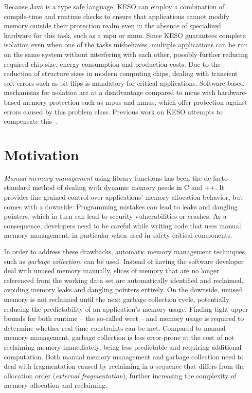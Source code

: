 		Because Java is a type safe language, KESO can employ a combination of compile-time and runtime checks to ensure
		that applications cannot modify memory outside their protection realm even in the absence of specialized hardware
		for this task, such as a \gls{mpu} or \gls{mmu}. Since KESO guarantees complete isolation even when one of the tasks
		misbehaves, multiple applications can be run on the same system without interfering with each other, possibly
		further reducing required chip size, energy consumption and production costs. Due to the reduction of structure
		sizes in modern computing chips, dealing with transient soft errors such as bit flips is mandatory for critical
		applications. Software-based mechanisms for isolation are at a disadvantage compared to \glspl{mcu} with
		hardware-based memory protection such as \glspl{mpu} and \glspl{mmu}, which offer protection against errors caused
		by this problem class. Previous work on KESO attempts to compensate this~\cite{thomm:11:jtres, stilkerich:13:lctes}.

	\section{Motivation}
		\label{sec:intro:motivation}

		\emph{Manual memory management} using library functions has been the de-facto standard method of dealing with
		dynamic memory needs in C and \C++{}. It provides fine-grained control over applications' memory allocation
		behavior, but comes with a downside: Programming mistakes can lead to leaks and dangling pointers, which in turn can
		lead to security vulnerabilities or crashes. As a consequence, developers need to be careful while writing code that
		uses manual memory management, in particular when used in safety-critical components.

		In order to address these drawbacks, automatic memory management techniques, such as \emph{garbage collection}, can
		be used. Instead of having the software developer deal with unused memory manually, slices of memory that are no
		longer referenced from the working data set are automatically identified and reclaimed, avoiding memory leaks and
		dangling pointers entirely. On the downside, unused memory is not reclaimed until the next garbage collection cycle,
		potentially reducing the predictability of an application's memory usage. Finding tight upper bounds for both
		runtime – the so-called \gls{wcet} – and memory usage is required to determine whether real-time constraints can be
		met. Compared to manual memory management, garbage collection is less error-prone at the cost of not reclaiming
		memory immediately, being less predictable and requiring additional computation. Both manual memory management and
		garbage collection need to deal with fragmentation caused by reclaiming in a sequence that differs from the
		allocation order (\emph{external fragmentation}), further increasing the complexity of memory allocation and
		reclaiming.

